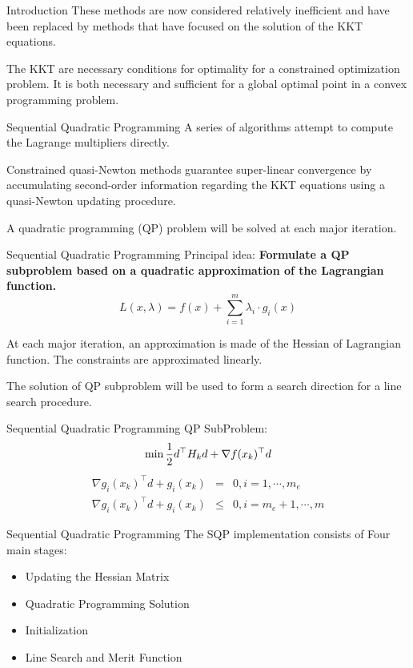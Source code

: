 \documentclass[10pt, compress]{beamer}
\begin{document}
\begin{frame}[fragile]{Introduction}
These methods are now considered relatively inefficient and have been replaced by methods that have focused on the solution of the KKT equations.

The KKT are necessary conditions for optimality for a constrained optimization problem. It is both necessary and sufficient for a global optimal point in a convex programming problem. 
\end{frame}

\begin{frame}[fragile]{Sequential Quadratic Programming}
A series of algorithms attempt to compute the Lagrange multipliers directly.

Constrained quasi-Newton methods guarantee super-linear convergence by accumulating second-order information regarding the KKT equations using a quasi-Newton updating procedure.

A quadratic programming (QP) problem will be solved at each major iteration.
\end{frame}

\begin{frame}[fragile]{Sequential Quadratic Programming}
Principal idea: \textbf{Formulate a QP subproblem based on a quadratic approximation of the Lagrangian function.}
$$L(x, \lambda) = f(x) + \sum_{i=1}^m \lambda_i \cdot g_i(x)$$

At each major iteration, an approximation is made of the Hessian of Lagrangian function. The constraints are approximated linearly. 

The solution of QP subproblem will be used to form a search direction for a line search procedure.
\end{frame}

\begin{frame}[fragile]{Sequential Quadratic Programming}
QP SubProblem:
$$ \min {1 \over 2} d^\top H_k d + \nabla f(x_k)^\top d$$
\begin{eqnarray*}
	\nabla g_i(x_k)^\top d + g_i(x_k) & = & 0, i = 1,\cdots, m_e \\
	\nabla g_i(x_k)^\top d + g_i(x_k) & \leq & 0, i = m_e+1,\cdots, m
\end{eqnarray*}
\end{frame}

\begin{frame}[fragile]{Sequential Quadratic Programming}
The SQP implementation consists of Four main stages:
\begin{itemize}
  \item Updating the Hessian Matrix
  \item Quadratic Programming Solution
  \item Initialization
  \item Line Search and Merit Function
\end{itemize}
\end{frame}
\end{document}
